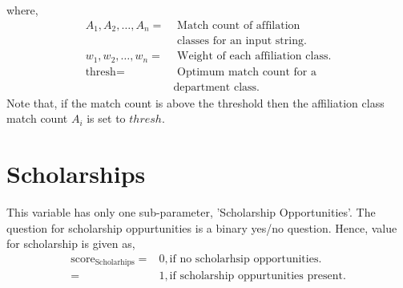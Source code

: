 \documentclass[oneside,twocolumn]{article}
\begin{document}
where,
\begin{align*}
  A_1, A_2, \dots, A_n =& \text{ Match count of affilation} \\
  & \text{ classes for an input string.} \\
  w_1, w_2, \dots, w_n =& \text{ Weight of each affiliation class.} \\
  \text{thresh} =& \text{ Optimum match count for a} \\
                &\text{department class.}
\end{align*}
Note that, if the match count is above the threshold then
the affiliation class match count \(A_i\) is set to \(thresh\).

\section{Scholarships}
This variable has only one sub-parameter, 'Scholarship Opportunities'.
The question for scholarship oppurtunities is a binary yes/no
question. Hence, value for scholarship is given as,
\begin{align*}
  \text{score}_{\text{Scholarhips}} =& 0, \text{if no scholarhsip opportunities.} \\
    =& 1, \text{if scholarship oppurtunities present}.
\end{align*}
\end{document}
